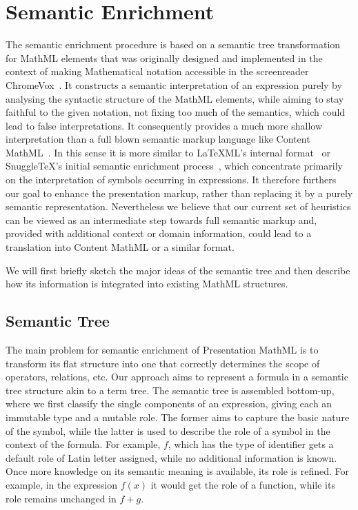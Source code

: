\documentclass{llncs}
\begin{document}
\section{Semantic Enrichment}
\label{sec:semantic-enrichment}

The semantic enrichment procedure is based on a semantic tree transformation for
MathML elements that was originally designed and implemented in the context of
making Mathematical notation accessible in the screenreader
ChromeVox~\cite{Sorge14}. It constructs a semantic interpretation of an
expression purely by analysing the syntactic structure of the MathML elements,
while aiming to stay faithful to the given notation, not fixing too much of the
semantics, which could lead to false interpretations. It consequently provides a
much more shallow interpretation than a full blown semantic markup language like
Content MathML~\cite{MML}. In this sense it is more similar to LaTeXML's internal
format~\cite{miller2010latexml} or SnuggleTeX's initial semantic enrichment
process~\cite{mckainsnuggletex}, which concentrate primarily on the
interpretation of symbols occurring in expressions.  It therefore furthers our
goal to enhance the presentation markup, rather than replacing it by a purely
semantic representation.  Nevertheless we believe that our current set of
heuristics can be viewed as an intermediate step towards full semantic markup
and, provided with additional context or domain information, could lead to a
translation into Content MathML or a similar format.

We will first briefly sketch the major ideas of the semantic tree and then
describe how its information is integrated into existing MathML structures.

\subsection{Semantic Tree}
\label{sec:semantic-tree}

The main problem for semantic enrichment of Presentation MathML is to transform
its flat structure into one that correctly determines the scope of operators,
relations, etc.  Our approach aims to represent a formula in a semantic tree
structure akin to a term tree. The semantic tree is assembled bottom-up, where
we first classify the single components of an expression, giving each an
immutable type and a mutable role. The former aims to capture the basic nature
of the symbol, while the latter is used to describe the role of a symbol in the
context of the formula. For example, $f$, which has the type of identifier gets
a default role of Latin letter assigned, while no additional information is
known. Once more knowledge on its semantic meaning is available, its role is
refined. For example, in the expression $f(x)$ it would get the role of a
function, while its role remains unchanged in $f + g$.
\end{document}
